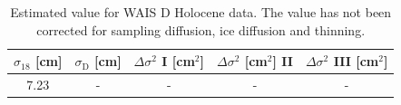 \documentclass[11pt, draftcls, onecolumn]{IEEEtran} %
\numberwithin{equation}{section}
\numberwithin{table}{section}
\numberwithin{figure}{section}
\begin{document}
\begin{appendices}
\begin{table}[H]
	\center
	\caption{Estimated value for WAIS D Holocene data.
		The value has not been corrected for sampling diffusion, ice diffusion and thinning.}
	\label{WAIS_D}
	\begin{tabular}{c c c c c} 
		\toprule
		$\sigma_{18}$ [cm] & $\sigma_\mathrm{D}$ [cm] & $\Delta\sigma^2$ I [cm$^2$] & $\Delta\sigma^2$ [cm$^2$] II & $\Delta\sigma^2$ III [cm$^2$] \\
		\midrule
		7.23 &   - &    - &     - &     - \\
		\bottomrule		
	\end{tabular}
\end{table}

\end{appendices}





\end{document}
